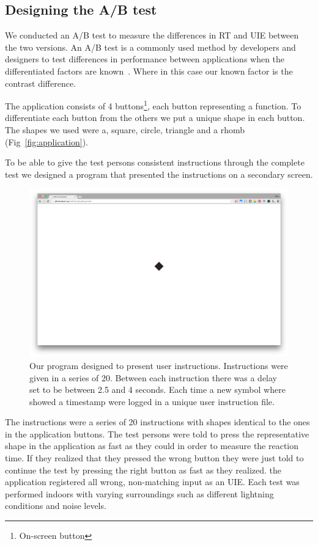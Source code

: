 \documentclass[runningheads,a4paper]{llncs}
\begin{document}
\subsection{Designing the A/B test}
We conducted an A/B test to measure the differences in RT and UIE between the two versions. An A/B test is a commonly used method by developers and designers to test differences in performance between applications when the differentiated factors are known~\cite{johnson2013designing}. Where in this case our known factor is the contrast difference. 

The application consists of 4 buttons\footnote{On-screen button}, each button representing a function. To differentiate each button from the others we put a unique shape in each button. The shapes we used were a, square, circle, triangle and a rhomb (Fig~\ref{fig:application}).

To be able to give the test persons consistent instructions through the complete test we designed a program that presented the instructions on a secondary screen. 
\begin{figure}
	\centering
	\includegraphics[width=\textwidth]{instructions}
	\caption{Our program designed to present user instructions. Instructions were given in a series of 20. Between each instruction there was a delay set to be between 2.5 and 4 seconds. Each time a new symbol where showed a timestamp were logged in a unique user instruction file.
	\label{fig:instructions}}
\end{figure}
The instructions were a series of 20 instructions with shapes identical to the ones in the application buttons. The test persons were told to press the representative shape in the application as fast as they could in order to measure the reaction time. If they realized that they pressed the wrong button they were just told to continue the test by pressing the right button as fast as they realized. the application registered all wrong, non-matching input as an UIE. Each test was performed indoors with varying surroundings such as different lightning conditions and noise levels. 
\end{document}
